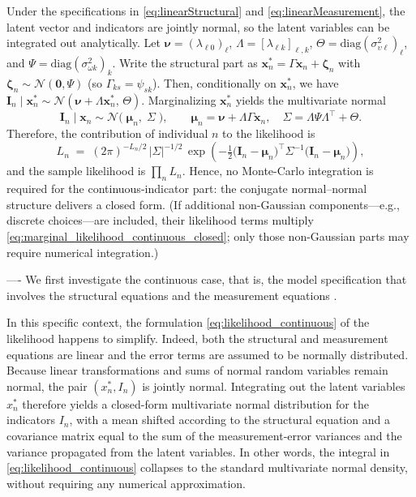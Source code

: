 \documentclass[12pt,a4paper]{article}
\begin{document}
Under the  specifications in \eqref{eq:linearStructural} and 
\eqref{eq:linearMeasurement}, the latent vector and indicators are jointly normal, 
so the latent variables can be integrated out analytically. 
Let $\boldsymbol{\nu}=(\lambda_{\ell 0})_{\ell}$, 
$\Lambda=[\lambda_{\ell k}]_{\ell,k}$, 
$\Theta=\mathrm{diag}(\sigma_{\upsilon\ell}^2)_{\ell}$, 
and $\Psi=\mathrm{diag}(\sigma_{\omega k}^2)_{k}$. 
Write the structural part as 
$\boldsymbol{x}_n^*=\Gamma \boldsymbol{x}_n+\boldsymbol{\zeta}_n$ 
with $\boldsymbol{\zeta}_n\sim\mathcal N(\mathbf{0},\Psi)$ 
(so $\Gamma_{ks}=\psi_{sk}$). 
Then, conditionally on $\boldsymbol{x}_n^*$, we have 
$\boldsymbol{I}_n\mid \boldsymbol{x}_n^* \sim 
\mathcal N(\boldsymbol{\nu}+\Lambda \boldsymbol{x}_n^*,\,\Theta)$. 
Marginalizing $\boldsymbol{x}_n^*$ yields the multivariate normal
\[
\boldsymbol{I}_n\mid \boldsymbol{x}_n \sim 
\mathcal N\!\big(\;\boldsymbol{\mu}_n,\;\Sigma\;\big),
\qquad
\boldsymbol{\mu}_n=\boldsymbol{\nu}+\Lambda\Gamma \boldsymbol{x}_n,\quad
\Sigma=\Lambda\Psi\Lambda^\top+\Theta.
\]
Therefore, the contribution of individual $n$ to the likelihood is
\begin{equation}
\label{eq:marginal_likelihood_continuous_closed}
L_n \;=\; (2\pi)^{-L_n/2}\,|\Sigma|^{-1/2}\,
\exp\!\left(-\tfrac{1}{2}\big(\boldsymbol{I}_n-\boldsymbol{\mu}_n\big)^{\!\top}
\Sigma^{-1}\big(\boldsymbol{I}_n-\boldsymbol{\mu}_n\big)\right),
\end{equation}
and the sample likelihood is $\prod_n L_n$. 
Hence, no Monte-Carlo integration is required for the continuous-indicator part: 
the conjugate normal--normal structure delivers a closed form. 
(If additional non-Gaussian components---e.g., discrete choices---are included, 
their likelihood terms multiply \eqref{eq:marginal_likelihood_continuous_closed}; 
only those non-Gaussian parts may require numerical integration.)

----
We first investigate the continuous case, that is, the model specification that involves the structural equations  and the measurement equations .

In this specific context, the formulation
\eqref{eq:likelihood_continuous} of the likelihood happens to
simplify.  Indeed, both the structural and measurement equations are
linear and the error terms are assumed to be normally distributed.  Because linear
transformations and sums of normal random variables remain normal,
the pair $(x_n^*, I_n)$ is jointly normal. Integrating out the latent
variables $x_n^*$ therefore yields a closed-form multivariate normal
distribution for the indicators $I_n$, with a mean shifted according
to the structural equation and a covariance matrix equal to the sum of
the measurement-error variances and the variance propagated from the
latent variables. In other words, the integral in
\eqref{eq:likelihood_continuous} collapses to the standard
multivariate normal density, without requiring any numerical
approximation.
\end{document}
